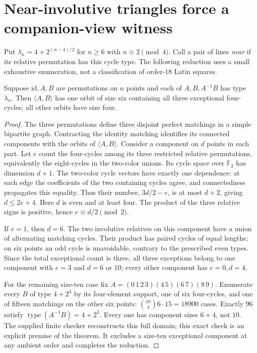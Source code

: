 \section{Near-involutive triangles force a companion-view witness}
\label{sec:near-triangles}

Put $\lambda_n=4+2^{(n-4)/2}$ for $n\geq6$ with $n\equiv2\pmod4$.
Call a pair of lines \emph{near} if its relative permutation has this
cycle type. The following reduction uses a small exhaustive enumeration,
not a classification of order-$18$ Latin squares.

\begin{computationaltheorem}
\label{thm:near-core}
Suppose $\mathrm{id},A,B$ are permutations on $n$ points and each of
$A,B,A^{-1}B$ has type $\lambda_n$. Then $\langle A,B\rangle$ has
one orbit of size six containing all three exceptional four-cycles;
all other orbits have size four.
\end{computationaltheorem}
\begin{proof}
The three permutations define three disjoint perfect matchings in a
simple bipartite graph. Contracting the identity matching identifies
its connected components with the orbits of $\langle A,B\rangle$.
Consider a component on $d$ points in each part. Let $e$ count the
four-cycles among its three restricted relative permutations,
equivalently the eight-cycles in the two-color unions.
Its cycle space over $\mathbb F_2$ has dimension
$d+1$. The two-color cycle vectors have exactly one dependence: at
each edge the coefficients of the two containing cycles agree, and
connectedness propagates this equality. Thus their number, $3d/2-e$,
is at most $d+2$, giving $d\leq2e+4$. Here $d$ is even and at least
four. The product of the three relative signs is positive, hence
$e\equiv d/2\pmod2$.

If $e=1$, then $d=6$. The two involutive relatives on this component
have a union of alternating matching cycles. Their product has paired
cycles of equal lengths; on six points an odd cycle is unavoidable,
contrary to the prescribed even types. Since the total exceptional
count is three, all three exceptions belong to one component with
$e=3$ and $d=6$ or $10$; every other component has $e=0,d=4$.

For the remaining size-ten case fix
$A=(0\,1\,2\,3)(4\,5)(6\,7)(8\,9)$.
Enumerate every $B$ of type $4+2^3$ by its four-element support,
one of six four-cycles, and one of fifteen matchings on the other
six points: $\binom{10}{4}6\cdot15=18900$ cases.
Exactly $96$ satisfy $\operatorname{type}(A^{-1}B)=4+2^3$.
Every one has component sizes $6+4$, not $10$. The supplied finite
checker reconstructs this full domain; this exact check is an explicit
premise of the theorem. It excludes a size-ten exceptional component
at any ambient order and completes the reduction.
\end{proof}

